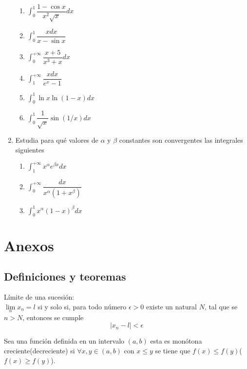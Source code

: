 \documentclass[10pt,twoside]{SelfArx} %
\begin{document}
\begin{enumerate}
	 \begin{enumerate}
	 	\item $ \displaystyle\int_{0}^{1}\dfrac{1-\cos x}{x^{2}\sqrt{x}}dx $
	 	\item $ \displaystyle\int_{0}^{1}\dfrac{xdx}{x-\sin x} $
	 	\item $ \displaystyle\int_{0}^{+\infty}\dfrac{x+5}{x^{3}+x}dx $
	 	\item $ \displaystyle\int_{1}^{+\infty}\dfrac{xdx}{e^{x}-1} $
	 	\item $ \displaystyle\int_{0}^{1}\ln x\ln(1-x)dx $
	 	\item $ \displaystyle\int_{0}^{1}\dfrac{1}{\sqrt{x}}\sin (1/x)dx $
	 \end{enumerate}
	 \item Estudia para qué valores de $ \alpha $ y $ \beta $ constantes son convergentes las integrales siguientes
	  \begin{enumerate}
	  	\item $ \displaystyle\int_{1}^{+\infty}x^{\alpha}e^{\beta x}dx $
	  	\item $ \displaystyle\int_{0}^{+\infty}\dfrac{dx}{x^{\alpha}(1+x^{\beta})} $
	  	\item $ \displaystyle\int_{0}^{1}x^{\alpha}(1-x)^{\beta}dx $
	  \end{enumerate}
\end{enumerate}
 
 
 
 
 
 
 
 
 \newpage
\section{Anexos}

\subsection{Definiciones y teoremas}
\begin{thm}
	Límite de una sucesión:\\
	$ \lim\limits_{n}x_{n}=l $ si y solo si, para todo número $ \epsilon>0 $ existe un  natural $ N $, tal que se $ n>N $,
	entonces se cumple \[ |x_{n}-l|<\epsilon \]
	
\end{thm}
\begin{thm}
	Sea una funci\'on definida en un intervalo $ (a,b) $ esta es mon\'otona creciente(decreciente) si $ \forall x,y\in(a,b) $ con $ x\leq y $ se tiene que $ f(x)\leq f(y) $($ f(x)\geq f(y) $).
\end{thm}
\end{document}
